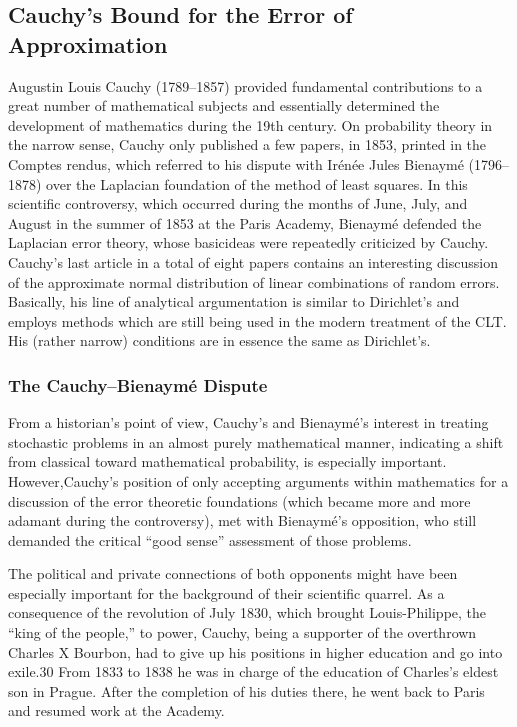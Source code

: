 \documentclass{article}
\begin{document}
\subsection{Cauchy’s Bound for the Error of Approximation}
Augustin Louis Cauchy (1789–1857) provided fundamental contributions to a great number of mathematical subjects and essentially determined the development of mathematics during the 19th century. On probability theory in the narrow sense,
Cauchy only published a few papers, in 1853, printed in the Comptes rendus, which referred to his dispute with Irénée Jules Bienaymé (1796–1878) over the Laplacian foundation of the method of least squares. In this scientific controversy, which occurred during the months of June, July, and August in the summer of 1853 at
the Paris Academy, Bienaymé defended the Laplacian error theory, whose basicideas were repeatedly criticized by Cauchy.
Cauchy’s last article in a total of eight papers contains an interesting discussion of the approximate normal distribution of
linear combinations of random errors.
Basically, his line of analytical argumentation
is similar to Dirichlet’s and employs methods which are still being used in the modern treatment of the CLT. His (rather narrow) conditions are in essence the same as Dirichlet’s.

\subsubsection{The Cauchy–Bienaymé Dispute}
From a historian’s point of view, Cauchy’s and Bienaymé’s interest in treating stochastic problems in an almost purely mathematical manner, indicating a shift from classical toward mathematical probability, is especially important. However,Cauchy’s position of only accepting arguments within mathematics for a discussion
of the error theoretic foundations (which became more and more adamant during the controversy), met with Bienaymé’s opposition, who still demanded the critical “good sense” assessment of those problems.

The political and private connections of both opponents might have been especially important for the background of their scientific quarrel. As a consequence of
the revolution of July 1830, which brought Louis-Philippe, the “king of the people,” to power, Cauchy, being a supporter of the overthrown Charles X Bourbon, had to
give up his positions in higher education and go into exile.30 From 1833 to 1838 he was in charge of the education of Charles’s eldest son in Prague. After the completion of his duties there, he went back to Paris and resumed work at the Academy.
\end{document}
